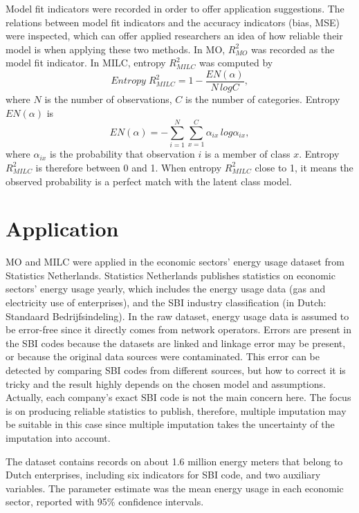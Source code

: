 \documentclass[oneside,a4paper]{article}
\begin{document}
Model fit indicators were recorded in order to offer application suggestions. The relations between model fit indicators and the accuracy indicators (bias, MSE) were inspected, which can offer applied researchers an idea of how reliable their model is when applying these two methods. In MO, $R_{MO}^2$ was recorded as the model fit indicator. In MILC, entropy $R_{MILC}^2$ was computed by
\begin{equation}
Entropy\;R_{MILC}^2 = 1- \frac{EN(\alpha)}{N\,logC},
\end{equation}
where $N$ is the number of observations, $C$ is the number of categories. Entropy $EN(\alpha)$ is
\begin{equation}
EN(\alpha) = - \sum_{i=1}^N\sum_{x=1}^C \alpha_{ix}\, log \alpha_{ix},
\end{equation}
where $\alpha_{ix}$ is the probability that observation $i$ is a member of class $x$. Entropy $R_{MILC}^2$ is therefore between 0 and 1. When entropy $R_{MILC}^2$ close to 1, it means the observed probability is a perfect match with the latent class model.

 \section{Application}
MO and MILC were applied in the economic sectors’ energy usage dataset from Statistics Netherlands. Statistics Netherlands publishes statistics on economic sectors’ energy usage yearly, which includes the energy usage data (gas and electricity use of enterprises), and the SBI industry classification (in Dutch: Standaard Bedrijfsindeling). In the raw dataset, energy usage data is assumed to be error-free since it directly comes from network operators. Errors are present in the SBI codes because the datasets are linked and linkage error may be present, or because the original data sources were contaminated. This error can be detected by comparing SBI codes from different sources, but how to correct it is tricky and the result highly depends on the chosen model and assumptions. Actually, each company’s exact SBI code is not the main concern here. The focus is on producing reliable statistics to publish, therefore, multiple imputation may be suitable in this case since multiple imputation takes the uncertainty of the imputation into account.

The dataset contains records on about 1.6 million energy meters that belong to Dutch enterprises, including six indicators for SBI code, and two auxiliary variables. The parameter estimate was the mean energy usage in each economic sector, reported with 95\% confidence intervals.  



\end{document}
